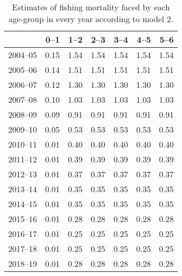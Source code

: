 \begin{table}[ht]
\centering
\begin{tabular}{rrrrrrr}
  \hline
 & 0--1 & 1--2 & 2--3 & 3--4 & 4--5 & 5--6 \\ 
  \hline
2004--05 & 0.15 & 1.54 & 1.54 & 1.54 & 1.54 & 1.54 \\ 
  2005--06 & 0.14 & 1.51 & 1.51 & 1.51 & 1.51 & 1.51 \\ 
  2006--07 & 0.12 & 1.30 & 1.30 & 1.30 & 1.30 & 1.30 \\ 
  2007--08 & 0.10 & 1.03 & 1.03 & 1.03 & 1.03 & 1.03 \\ 
  2008--09 & 0.09 & 0.91 & 0.91 & 0.91 & 0.91 & 0.91 \\ 
  2009--10 & 0.05 & 0.53 & 0.53 & 0.53 & 0.53 & 0.53 \\ 
  2010--11 & 0.01 & 0.40 & 0.40 & 0.40 & 0.40 & 0.40 \\ 
  2011--12 & 0.01 & 0.39 & 0.39 & 0.39 & 0.39 & 0.39 \\ 
  2012--13 & 0.01 & 0.37 & 0.37 & 0.37 & 0.37 & 0.37 \\ 
  2013--14 & 0.01 & 0.35 & 0.35 & 0.35 & 0.35 & 0.35 \\ 
  2014--15 & 0.01 & 0.35 & 0.35 & 0.35 & 0.35 & 0.35 \\ 
  2015--16 & 0.01 & 0.28 & 0.28 & 0.28 & 0.28 & 0.28 \\ 
  2016--17 & 0.01 & 0.25 & 0.25 & 0.25 & 0.25 & 0.25 \\ 
  2017--18 & 0.01 & 0.25 & 0.25 & 0.25 & 0.25 & 0.25 \\ 
  2018--19 & 0.01 & 0.28 & 0.28 & 0.28 & 0.28 & 0.28 \\ 
   \hline
\end{tabular}
\caption{Estimates of fishing mortality faced by each age-group in every year according to model 2.} 
\label{tab:Mod2-FishingMortality}
\end{table}
